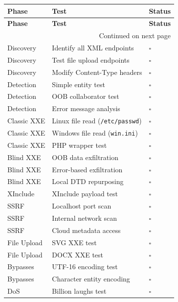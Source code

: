 \documentclass{article}
\begin{document}
\begin{longtable}{|p{2.5cm}|p{9cm}|p{1.5cm}|}
\hline
\textbf{Phase} & \textbf{Test} & \textbf{Status} \\
\hline
\endfirsthead
\hline
\textbf{Phase} & \textbf{Test} & \textbf{Status} \\
\hline
\endhead
\hline
\multicolumn{3}{|r|}{Continued on next page} \\
\hline
\endfoot
\hline
\endlastfoot

Discovery & Identify all XML endpoints & $\square$ \\
\hline
Discovery & Test file upload endpoints & $\square$ \\
\hline
Discovery & Modify Content-Type headers & $\square$ \\
\hline
Detection & Simple entity test & $\square$ \\
\hline
Detection & OOB collaborator test & $\square$ \\
\hline
Detection & Error message analysis & $\square$ \\
\hline
Classic XXE & Linux file read (\texttt{/etc/passwd}) & $\square$ \\
\hline
Classic XXE & Windows file read (\texttt{win.ini}) & $\square$ \\
\hline
Classic XXE & PHP wrapper test & $\square$ \\
\hline
Blind XXE & OOB data exfiltration & $\square$ \\
\hline
Blind XXE & Error-based exfiltration & $\square$ \\
\hline
Blind XXE & Local DTD repurposing & $\square$ \\
\hline
XInclude & XInclude payload test & $\square$ \\
\hline
SSRF & Localhost port scan & $\square$ \\
\hline
SSRF & Internal network scan & $\square$ \\
\hline
SSRF & Cloud metadata access & $\square$ \\
\hline
File Upload & SVG XXE test & $\square$ \\
\hline
File Upload & DOCX XXE test & $\square$ \\
\hline
Bypasses & UTF-16 encoding test & $\square$ \\
\hline
Bypasses & Character entity encoding & $\square$ \\
\hline
DoS & Billion laughs test & $\square$ \\
\hline
\end{longtable}
\end{document}

